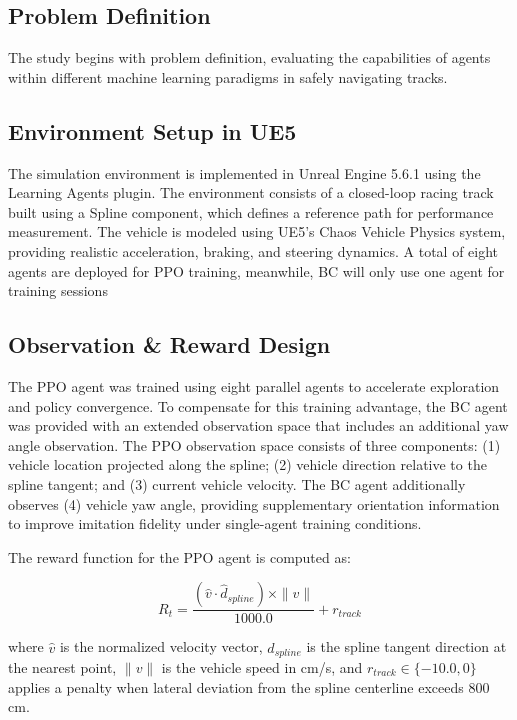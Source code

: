 \documentclass[conference]{IEEEtran}
\begin{document}
\subsection{Problem Definition}
The study begins with problem definition, evaluating the capabilities of agents within different machine learning paradigms in safely navigating tracks.

\subsection{Environment Setup in UE5}
The simulation environment is implemented in Unreal Engine 5.6.1 using the Learning Agents plugin. The environment consists of a closed-loop racing track built using a Spline component, which defines a reference path for performance measurement. The vehicle is modeled using UE5's Chaos Vehicle Physics system, providing realistic acceleration, braking, and steering dynamics. A total of eight agents are deployed for PPO training, meanwhile, BC will only use one agent for training sessions

\subsection{Observation \& Reward Design}
The PPO agent was trained using eight parallel agents to 
accelerate exploration and policy convergence. To compensate 
for this training advantage, the BC agent was provided with 
an extended observation space that includes an additional 
yaw angle observation. The PPO observation space consists 
of three components: (1) vehicle location projected along 
the spline; (2) vehicle direction relative to the spline 
tangent; and (3) current vehicle velocity. The BC agent 
additionally observes (4) vehicle yaw angle, providing 
supplementary orientation information to improve imitation 
fidelity under single-agent training conditions.

The reward function for the PPO agent is computed as:

\begin{equation}
R_t = \frac{(\hat{v} \cdot \hat{d}_{spline}) \times \|v\|}{1000.0} + r_{track}
\end{equation}

where $\hat{v}$ is the normalized velocity vector, 
$\hat{d}_{spline}$ is the spline tangent direction at the 
nearest point, $\|v\|$ is the vehicle speed in cm/s, 
and $r_{track} \in \{-10.0, 0\}$ applies a penalty when 
lateral deviation from the spline centerline exceeds 800 cm.
\end{document}
